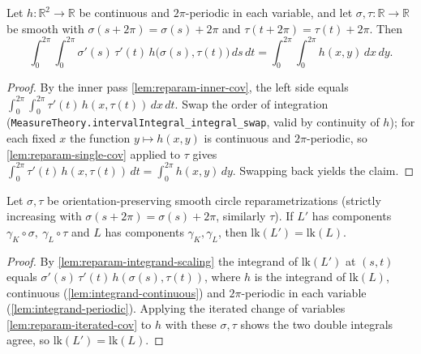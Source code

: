 \begin{lemma}
    \label{lem:reparam-iterated-cov}
    Let $h:\mathbb{R}^2\to\mathbb{R}$ be continuous and $2\pi$-periodic in each
    variable, and let $\sigma,\tau:\mathbb{R}\to\mathbb{R}$ be smooth with
    $\sigma(s+2\pi)=\sigma(s)+2\pi$ and $\tau(t+2\pi)=\tau(t)+2\pi$. Then
    \[
        \int_0^{2\pi}\!\!\int_0^{2\pi}\sigma'(s)\,\tau'(t)\,h\bigl(\sigma(s),\tau(t)\bigr)\,ds\,dt
        = \int_0^{2\pi}\!\!\int_0^{2\pi} h(x,y)\,dx\,dy .
    \]
\end{lemma}
\begin{proof}
    By the inner pass \cref{lem:reparam-inner-cov}, the left side equals
    $\int_0^{2\pi}\!\int_0^{2\pi}\tau'(t)\,h(x,\tau(t))\,dx\,dt$. Swap the order of
    integration (\texttt{MeasureTheory.intervalIntegral\_integral\_swap}, valid by
    continuity of $h$); for each fixed $x$ the function $y\mapsto h(x,y)$ is
    continuous and $2\pi$-periodic, so \cref{lem:reparam-single-cov} applied to
    $\tau$ gives $\int_0^{2\pi}\tau'(t)\,h(x,\tau(t))\,dt=\int_0^{2\pi}h(x,y)\,dy$.
    Swapping back yields the claim.
\end{proof}

\begin{lemma}
    \label{lem:reparam-invariant}
    Let $\sigma,\tau$ be orientation-preserving smooth circle reparametrizations
    (strictly increasing with $\sigma(s+2\pi)=\sigma(s)+2\pi$, similarly $\tau$). If
    $L'$ has components $\gamma_K\circ\sigma,\ \gamma_L\circ\tau$ and $L$ has
    components $\gamma_K,\gamma_L$, then $\mathrm{lk}(L') = \mathrm{lk}(L)$.
\end{lemma}
\begin{proof}
    By \cref{lem:reparam-integrand-scaling} the integrand of $\mathrm{lk}(L')$ at
    $(s,t)$ equals $\sigma'(s)\,\tau'(t)\,h(\sigma(s),\tau(t))$, where $h$ is the
    integrand of $\mathrm{lk}(L)$, continuous (\cref{lem:integrand-continuous}) and
    $2\pi$-periodic in each variable (\cref{lem:integrand-periodic}). Applying the iterated
    change of variables \cref{lem:reparam-iterated-cov} to $h$ with these
    $\sigma,\tau$ shows the two double integrals agree, so
    $\mathrm{lk}(L')=\mathrm{lk}(L)$.
\end{proof}

